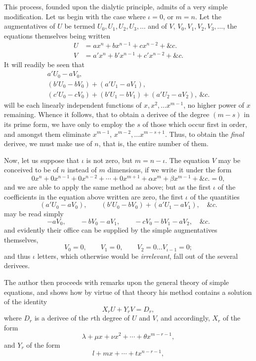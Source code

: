 \documentclass[11pt]{article}
\newcommand{\sourcepage}[1]{\marginpar{\scriptsize p.~#1}}
\begin{document}
\sourcepage{87}
This process, founded upon the dialytic principle, admits of a very simple modification. Let us begin with the case where $\iota=0$, or $m=n$. Let the augmentatives of $U$ be termed $U_0,U_1,U_2,U_3,\ldots$ and of $V$, $V_0,V_1,V_2,V_3,\ldots$, the equations themselves being written
\[
\begin{aligned}
 U&=ax^n+bx^{n-1}+cx^{n-2}+\&c.\\
 V&=a'x^n+b'x^{n-1}+c'x^{n-2}+\&c.
\end{aligned}
\]
It will readily be seen that
\[
\begin{gathered}
 a'U_0-aV_0,\\
 (b'U_0-bV_0)+(a'U_1-aV_1),\\
 (c'U_0-cV_0)+(b'U_1-bV_1)+(a'U_2-aV_2),\ \&c.
\end{gathered}
\]
will be each linearly independent functions of $x,x^2,\ldots x^{m-1}$, no higher power of $x$ remaining. Whence it follows, that to obtain a derivee of the degree $(m-s)$ in its prime form, we have only to employ the $s$ of those which occur first in order, and amongst them eliminate $x^{m-1}$, $x^{m-2},\ldots x^{m-s+1}$. Thus, to obtain the \emph{final} derivee, we must make use of $n$, that is, the entire number of them.

Now, let us suppose that $\iota$ is not zero, but $m=n-\iota$. The equation $V$ may be conceived to be of $n$ instead of $m$ dimensions, if we write it under the form
\[
 0x^n+0x^{n-1}+0x^{n-2}+\cdots+0x^{m+1}+\alpha x^m+\beta x^{m-1}+\&c.=0,
\]
and we are able to apply the same method as above; but as the first $\iota$ of the coefficients in the equation above written are zero, the first $\iota$ of the quantities
\[
 (a'U_0-aV_0),\qquad (b'U_0-bV_0)+(a'U_1-aV_1),\quad \&c.
\]
may be read simply
\[
 -aV_0,\qquad -bV_0-aV_1,
 \qquad -cV_0-bV_1-aV_2,\quad \&c.
\]
and evidently their office can be supplied by the simple augmentatives themselves,
\[
 V_0=0,\qquad V_1=0,\qquad V_2=0\ldots V_{\iota-1}=0;
\]
and thus $\iota$ letters, which otherwise would be \emph{irrelevant}, fall out of the several derivees.

The author then proceeds with remarks upon the general theory of simple equations, and shows how by virtue of that theory his method contains a solution of the identity
\[
 X_rU+Y_rV=D_r,
\]
where $D_r$ is a derivee of the $r$th degree of $U$ and $V$, and accordingly, $X_r$ of the form
\[
 \lambda+\mu x+\nu x^2+\cdots+\theta x^{m-r-1},
\]
and $Y_r$ of the form
\[
 l+mx+\cdots+tx^{n-r-1},
\]
\end{document}
